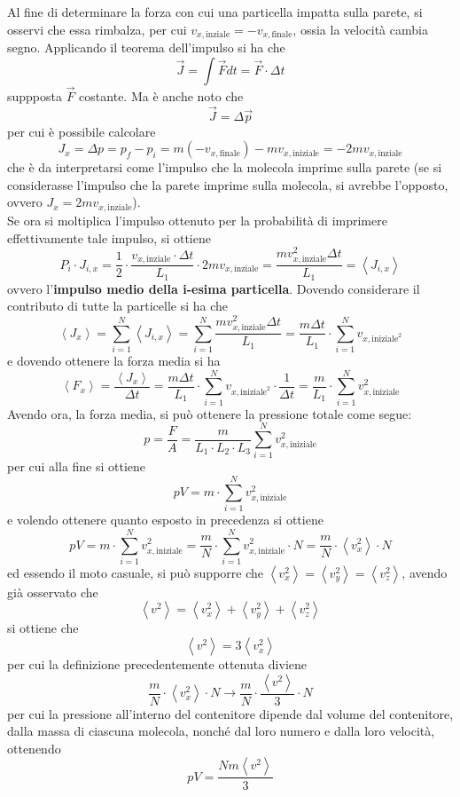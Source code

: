 \documentclass[a4paper]{extarticle}
\begin{document}
\vspace{1em}
\noindent
Al fine di determinare la forza con cui una particella impatta sulla parete, si osservi che essa rimbalza, per cui $v_{x,\text{inziale}} = - v_{x,\text{finale}}$, ossia la velocità cambia segno. Applicando il teorema dell'impulso si ha che
\[\vec J = \int \vec F dt = \vec F \cdot \Delta t\]
suppposta $\vec F$ costante. Ma è anche noto che
\[\vec J = \Delta \vec p\]
per cui è possibile calcolare
\[J_x = \Delta p = p_f - p_i = m (-v_{x,\text{finale}}) - m v_{x,\text{iniziale}} = - 2 m v_{x,\text{inziale}}\]
che è da interpretarsi come l'impulso che la molecola imprime sulla parete (se si considerasse l'impulso che la parete imprime sulla molecola, si avrebbe l'opposto, ovvero $J_x = 2 m v_{x,\text{inziale}}$).\\
Se ora si moltiplica l'impulso ottenuto per la probabilità di imprimere effettivamente tale impulso, si ottiene
\[P_i \cdot J_{i,x} = \frac{1}{2} \cdot \frac{v_{x,\text{inziale}} \cdot \Delta t}{L_1} \cdot 2m v_{x,\text{inziale}} = \frac{m v_{x,\text{inziale}}^2 \Delta t}{L_1} = \left< J_{i,x} \right>\]
ovvero l'\textbf{impulso medio della i-esima particella}. Dovendo considerare il contributo di tutte la particelle si ha che
\[\left<J_x\right> = \sum_{i=1}^N \left< J_{i,x} \right> = \sum_{i=1}^N \frac{m v_{x,\text{inziale}}^2 \Delta t}{L_1} = \frac{m \Delta t}{L_1} \cdot \sum_{i=1}^N v_{x,\text{iniziale}^2}\]
e dovendo ottenere la forza media si ha
\[\left< F_{x} \right> = \frac{\left< J_x \right>}{\Delta t} =  \frac{m \Delta t}{L_1} \cdot \sum_{i=1}^N v_{x,\text{iniziale}^2} \cdot \frac{1}{\Delta t} = \frac{m}{L_1} \cdot \sum_{i=1}^N v_{x,\text{iniziale}}^2\]
Avendo ora, la forza media, si può ottenere la pressione totale come segue:
\[p=\frac{F}{A} = \frac{m}{L_1 \cdot L_2 \cdot L_3} \sum_{i=1}^N v_{x,\text{iniziale}}^2\]
per cui alla fine si ottiene
\[p V = m \cdot \sum_{i=1}^N v_{x,\text{iniziale}}^2\]
e volendo ottenere quanto esposto in precedenza si ottiene
\[p V = m \cdot \sum_{i=1}^N v_{x,\text{iniziale}}^2 = \frac{m}{N} \cdot \sum_{i=1}^N v_{x,\text{iniziale}}^2 \cdot N = \frac{m}{N} \cdot \left<v_x^2\right> \cdot N\]
ed essendo il moto casuale, si può supporre che $\left<v_x^2\right>=\left<v_y^2\right>=\left<v_z^2\right>$, avendo già osservato che
\[\left<v^2\right> = \left<v_x^2\right> + \left<v_y^2\right> + \left<v_z^2\right>\]
si ottiene che
\[\left<v^2\right> = 3 \left<v_x^2\right>\]
per cui la definizione precedentemente ottenuta diviene
\[\frac{m}{N} \cdot \left<v_x^2\right> \cdot N \longrightarrow \frac{m}{N} \cdot \frac{\left<v^2\right>}{3} \cdot N\]
per cui la pressione all'interno del contenitore dipende dal volume del contenitore, dalla massa di ciascuna molecola, nonché dal loro numero e dalla loro velocità, ottenendo
\[\boxed{pV = \frac{N m \left< v^2 \right>}{3}}\]
\end{document}
